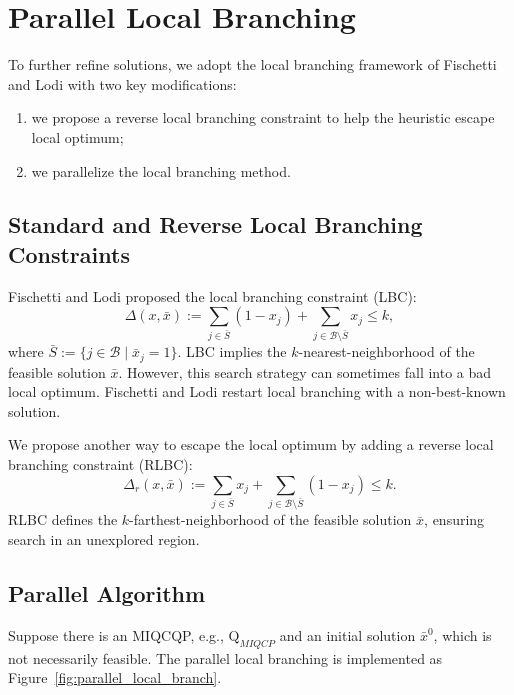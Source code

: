 \documentclass[]{article}
\begin{document}
\section{Parallel Local Branching}\label{sec:PLB}
To further refine solutions, we adopt the local branching framework of Fischetti and Lodi \cite{fischetti2003local} with two key modifications:  
\begin{enumerate}
    \item we propose a reverse local branching constraint to help the heuristic escape local optimum;
    \item we parallelize the local branching method.
\end{enumerate}

\subsection{Standard and Reverse Local Branching Constraints}  
Fischetti and Lodi \cite{fischetti2003local} proposed the local branching constraint (LBC):  
\begin{equation}
    \Delta(x, \bar{x}) := \sum_{j \in \bar{S}} (1 - x_j) + \sum_{j \in \mathcal{B} \setminus \bar{S}} x_j \leq k,
\end{equation}  
where $\bar{S} := \{j \in \mathcal{B} \mid \bar{x}_j = 1\}$. LBC implies the $k$-nearest-neighborhood of the feasible solution $\bar{x}$. However, this search strategy can sometimes fall into a bad local optimum. Fischetti and Lodi \cite{fischetti2003local} restart local branching with a non-best-known solution.

We propose another way to escape the local optimum by adding a reverse local branching constraint (RLBC):  
\begin{equation}
    \Delta_r(x, \bar{x}) := \sum_{j \in \bar{S}} x_j + \sum_{j \in \mathcal{B} \setminus \bar{S}} (1 - x_j) \leq k.
\end{equation}  
RLBC defines the $k$-farthest-neighborhood of the feasible solution $\bar{x}$, ensuring search in an unexplored region.

\subsection{Parallel Algorithm}  

Suppose there is an MIQCQP, e.g., $\mathrm{Q}_{MIQCP}$ and an initial solution $\bar{x}^0$, which is not necessarily feasible. The parallel local branching is implemented as Figure~\ref{fig:parallel_local_branch}. 
\end{document}
